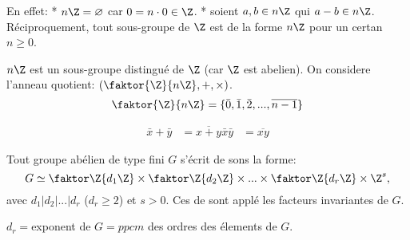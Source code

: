 En effet: * $n\Z=\varnothing$ car $0=n\cdot 0\in\Z$. * soient $a,b\in n\Z$ qui $a-b\in n\Z$. Réciproquement, tout sous-groupe de $\Z$ est de la forme $n\Z$ pour un certan $n\geq 0$.

$n\Z$ est un sous-groupe distingué de $\Z$ (car $\Z$ est abelien). On considere l'anneau quotient: $(\faktor{\Z}{n\Z}, +, \times)$.
$$\faktor{\Z}{n\Z}=\{\bar 0,\bar 1, \bar 2, ..., \overline{n-1}\}$$

\begin{align}
	\bar x+\bar y &= \overline{x+y}
	\bar x \bar y &= \overline{xy}
\end{align}

\begin{theorem}
	Tout groupe abélien de type fini $G$ s'écrit de sons la forme:
	$$G\simeq \faktor\Z{d_1\Z} \times \faktor\Z{d_2\Z} \times ... \times \faktor\Z{d_r\Z} \times \Z^s,$$
	avec $d_1|d_2|...|d_r$ ($d_r\geq 2$) et $s>0$. Ces de sont applé les facteurs invariantes de $G$.
\end{theorem}
\begin{remark}
	$d_r = $exponent de $G = ppcm$ des ordres des élements de $G$. 
\end{remark}

